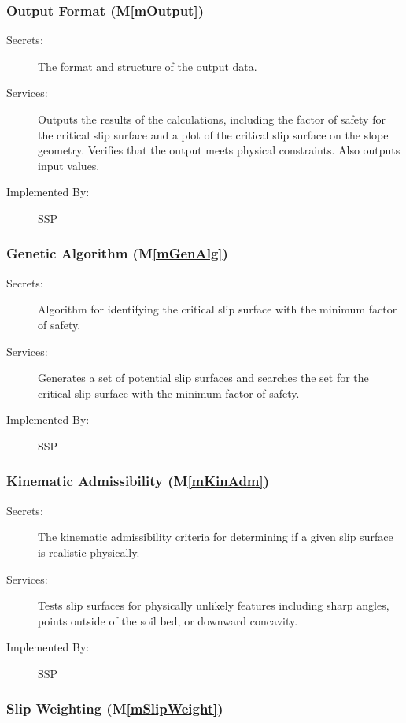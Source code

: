 \documentclass[12pt, titlepage]{article}
\newcommand{\progname}{SSP}
\newcommand{\mref}[1]{M\ref{#1}}
\begin{document}
\subsubsection{Output Format (\mref{mOutput})}

\begin{description}
\item[Secrets:] The format and structure of the output data.
\item[Services:] Outputs the results of the calculations, including
  the factor of safety for the critical slip surface and a plot of the critical
  slip surface on the slope geometry. Verifies that the output meets physical 
  constraints. Also outputs input values.
\item[Implemented By:] \progname
\end{description} 


\subsubsection{Genetic Algorithm (\mref{mGenAlg})}

\begin{description}
\item[Secrets:] Algorithm for identifying the critical slip surface with the 
minimum factor of safety.
\item[Services:] Generates a set of potential slip surfaces and searches the 
set for the critical slip surface with the minimum factor of safety.
\item[Implemented By:] \progname
\end{description}


\subsubsection{Kinematic Admissibility (\mref{mKinAdm})}

\begin{description}
\item[Secrets:] The kinematic admissibility criteria for determining if a given 
slip surface is realistic physically.
\item[Services:] Tests slip surfaces for physically unlikely features including 
sharp angles, points outside of the soil bed, or downward concavity.
\item[Implemented By:] \progname
\end{description} 

\subsubsection{Slip Weighting (\mref{mSlipWeight})}
\end{document}

